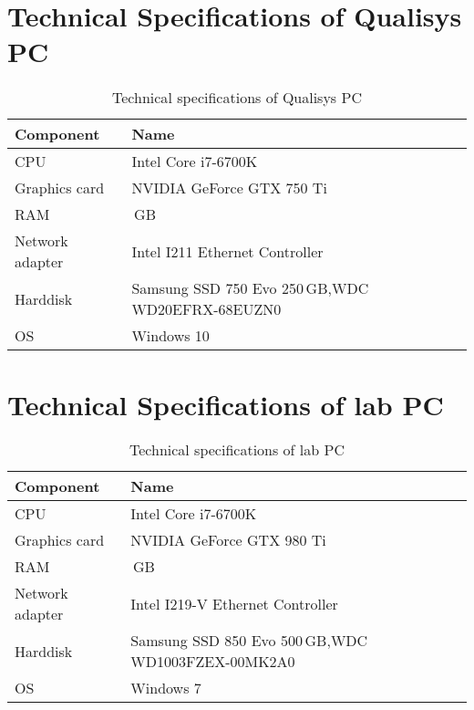 \section{Technical Specifications of Qualisys PC} \label{appendix:qualisys_specs}
\begin{table}[!h]
	\centering
	\begin{tabular}{|>{\RaggedRight}p{3cm}|>{\RaggedRight}p{9cm}|}\hline
		\rowcolor[gray] {.6} \textbf{Component} & \textbf{Name} \\ \hline
		CPU & Intel Core i7-6700K \\ \hline
		Graphics card & NVIDIA GeForce GTX 750 Ti \\ \hline
		RAM & 16\,GB \\ \hline
		Network adapter & Intel I211 Ethernet Controller \\ \hline
		Harddisk & Samsung SSD 750 Evo 250\,GB,\newline WDC WD20EFRX-68EUZN0 \\ \hline
		OS & Windows 10 \\ \hline
	\end{tabular}
	\caption{Technical specifications of Qualisys PC}
\end{table}


\section{Technical Specifications of lab PC} \label{appendix:specs_lab_pc}
\begin{table}[!h]
	\centering
	\begin{tabular}{|>{\RaggedRight}p{3cm}|>{\RaggedRight}p{9cm}|}\hline
		\rowcolor[gray] {.6} \textbf{Component} & \textbf{Name} \\ \hline
		CPU & Intel Core i7-6700K \\ \hline
		Graphics card & NVIDIA GeForce GTX 980 Ti \\ \hline
		RAM & 16\,GB \\ \hline
		Network adapter & Intel I219-V Ethernet Controller \\ \hline
		Harddisk & Samsung SSD 850 Evo 500\,GB,\newline WDC WD1003FZEX-00MK2A0 \\ \hline
		OS & Windows 7 \\ \hline
	\end{tabular}
	\caption{Technical specifications of lab PC}
\end{table}


